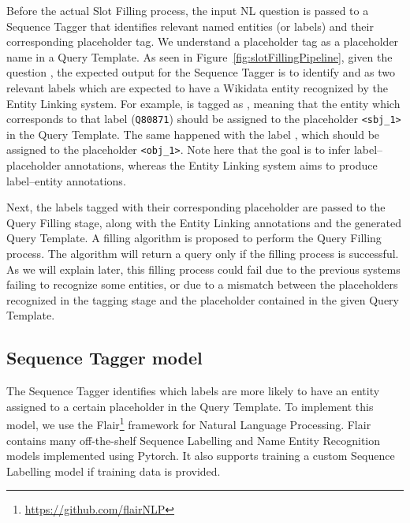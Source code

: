 Before the actual Slot Filling process, the input NL question is passed to a Sequence Tagger 
that identifies relevant named entities (or labels) and their 
corresponding placeholder tag. We understand a placeholder tag as a placeholder name in a 
Query Template. As seen in Figure~\ref{fig:slotFillingPipeline}, given the question 
, the expected output for the Sequence Tagger is to 
identify  and  as two relevant labels which 
are expected to have a Wikidata entity recognized by the Entity Linking system. For example, 
 is tagged as , meaning that the entity which 
corresponds to that label (\texttt{Q80871}) should be assigned to the placeholder 
\texttt{<sbj\_1>} in the Query Template. The same happened with the label , 
which should be assigned to the placeholder \texttt{<obj\_1>}. Note here that the goal is to 
infer label--placeholder annotations, whereas the Entity Linking system aims to produce 
label--entity annotations. 

Next, the labels tagged with their corresponding placeholder are passed to the Query Filling 
stage, along with the Entity Linking annotations and the generated Query Template. A filling 
algorithm is proposed to perform the Query Filling process. The algorithm will return a 
\SPARQL{} query only if the filling process is successful. As we will explain later, this filling 
process could fail due to the previous systems failing to recognize some entities, or due to 
a mismatch between the placeholders recognized in the tagging stage and the placeholder 
contained in the given Query Template.

\subsection{Sequence Tagger model}
\label{cap3:system/slotFillModule/seqTagger}
The Sequence Tagger identifies which labels are more likely to have an entity 
assigned to a certain placeholder in the Query Template. To implement this model, we use the 
Flair\footnote{\url{https://github.com/flairNLP}} framework for Natural Language Processing. Flair 
contains many off-the-shelf Sequence Labelling and Name Entity Recognition models implemented 
using Pytorch. It also supports  training a custom Sequence Labelling model if training data 
is provided.


